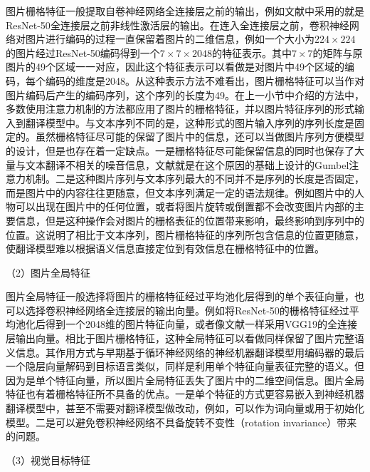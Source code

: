 图片栅格特征一般提取自卷神经网络全连接层之前的输出，例如文献\cite{36_calixto-etal-2017-doubly}中采用的就是ResNet-50\cite{32_DBLP:conf/cvpr/HeZRS16}全连接层之前非线性激活层的输出。在连入全连接层之前，卷积神经网络对图片进行编码的过程一直保留着图片的二维信息，例如一个大小为$224 \times 224$的图片经过ResNet-50编码得到一个$7 \times 7 \times 2048$的特征表示。其中$7 \times 7$的矩阵与原图片的49个区域一一对应，因此这个特征表示可以看做是对图片中49个区域的编码，每个编码的维度是2048。从这种表示方法不难看出，图片栅格特征可以当作对图片编码后产生的编码序列，这个序列的长度为49。在上一小节中介绍的方法中，多数使用注意力机制的方法都应用了图片的栅格特征，并以图片特征序列的形式输入到翻译模型中。与文本序列不同的是，这种形式的图片输入序列的序列长度是固定的。虽然栅格特征尽可能的保留了图片中的信息，还可以当做图片序列方便模型的设计，但是也存在着一定缺点。一是栅格特征尽可能保留信息的同时也保存了大量与文本翻译不相关的噪音信息，文献\cite{104_DBLP:journals/corr/abs-2103-08862}就是在这个原因的基础上设计的Gumbel注意力机制。二是这种图片序列与文本序列最大的不同并不是序列的长度是否固定，而是图片中的内容往往更随意，但文本序列满足一定的语法规律。例如图片中的人物可以出现在图片中的任何位置，或者将图片旋转或倒置都不会改变图片内部的主要信息，但是这种操作会对图片的栅格表征的位置带来影响\cite{108_DBLP:journals/corr/abs-2211-11812,109_DBLP:journals/corr/abs-2007-10588,110_DBLP:journals/jmlr/AzulayW19}，最终影响到序列中的位置。这说明了相比于文本序列，图片栅格特征的序列所包含信息的位置更随意，使翻译模型难以根据语义信息直接定位到有效信息在栅格特征中的位置。

{\sffamily （2）图片全局特征}

图片全局特征一般选择将图片的栅格特征经过平均池化层得到的单个表征向量，也可以选择卷积神经网络全连接层的输出向量。例如将ResNet-50的栅格特征经过平均池化后得到一个2048维的图片特征向量，或者像文献\cite{18_DBLP:conf/emnlp/CalixtoL17}一样采用VGG19\cite{DBLP:journals/corr/SimonyanZ14a}的全连接层输出向量。相比于图片栅格特征，这种全局特征可以看做同样保留了图片完整语义信息。其作用方式与早期基于循环神经网络的神经机器翻译模型用编码器的最后一个隐层向量解码到目标语言类似，同样是利用单个特征向量表征完整的语义。但因为是单个特征向量，所以图片全局特征丢失了图片中的二维空间信息。图片全局特征也有着栅格特征所不具备的优点。一是单个特征的方式更容易嵌入到神经机器翻译模型中，甚至不需要对翻译模型做改动，例如，可以作为词向量或用于初始化模型。二是可以避免卷积神经网络不具备旋转不变性（rotation invariance）带来的问题。

{\sffamily （3）视觉目标特征}

